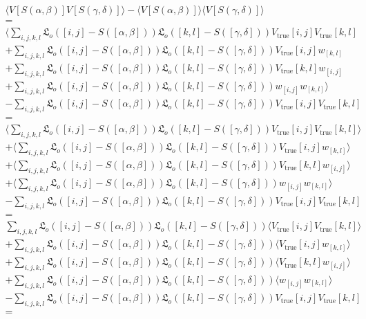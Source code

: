 \documentclass[times]{aastex6}
\begin{document}
\begin{multline*}
   \langle V[S(\alpha, \beta)]V[S(\gamma, \delta)] \rangle - \langle V[S(\alpha, \beta)] \rangle \langle V[S(\gamma, \delta)] \rangle \\ = \\ \langle \sum_{i,j,k,l}\mathfrak{L}_{o}([i,j] - S([\alpha, \beta]))\mathfrak{L}_{o}([k,l] - S([\gamma, \delta]))V_{\mathrm{true}}[i,j]V_{\mathrm{true}}[k,l] \\ + \sum_{i,j,k,l}\mathfrak{L}_{o}([i,j] - S([\alpha, \beta]))\mathfrak{L}_{o}([k,l] - S([\gamma, \delta]))V_{\mathrm{true}}[i,j]w_{[k,l]} \\ + \sum_{i,j,k,l}\mathfrak{L}_{o}([i,j] - S([\alpha, \beta]))\mathfrak{L}_{o}([k,l] - S([\gamma, \delta]))V_{\mathrm{true}}[k,l]w_{[i,j]} \\ + \sum_{i,j,k,l}\mathfrak{L}_{o}([i,j] - S([\alpha, \beta]))\mathfrak{L}_{o}([k,l] - S([\gamma, \delta]))w_{[i,j]}w_{[k,l]} \rangle \\ - \sum_{i,j,k,l}\mathfrak{L}_{o}([i,j] - S([\alpha, \beta])) \mathfrak{L}_{o}([k,l] - S([\gamma, \delta])) V_{\mathrm{true}}[i,j] V_{\mathrm{true}}[k,l] \\ = \\ \langle \sum_{i,j,k,l}\mathfrak{L}_{o}([i,j] - S([\alpha, \beta]))\mathfrak{L}_{o}([k,l] - S([\gamma, \delta]))V_{\mathrm{true}}[i,j]V_{\mathrm{true}}[k,l] \rangle \\ + \langle \sum_{i,j,k,l}\mathfrak{L}_{o}([i,j] - S([\alpha, \beta]))\mathfrak{L}_{o}([k,l] - S([\gamma, \delta]))V_{\mathrm{true}}[i,j]w_{[k,l]} \rangle \\ + \langle \sum_{i,j,k,l}\mathfrak{L}_{o}([i,j] - S([\alpha, \beta]))\mathfrak{L}_{o}([k,l] - S([\gamma, \delta]))V_{\mathrm{true}}[k,l]w_{[i,j]} \rangle \\ + \langle \sum_{i,j,k,l}\mathfrak{L}_{o}([i,j] - S([\alpha, \beta]))\mathfrak{L}_{o}([k,l] - S([\gamma, \delta]))w_{[i,j]}w_{[k,l]} \rangle \\ - \sum_{i,j,k,l}\mathfrak{L}_{o}([i,j] - S([\alpha, \beta])) \mathfrak{L}_{o}([k,l] - S([\gamma, \delta])) V_{\mathrm{true}}[i,j] V_{\mathrm{true}}[k,l] \\ = \\ \sum_{i,j,k,l}\mathfrak{L}_{o}([i,j] - S([\alpha, \beta]))\mathfrak{L}_{o}([k,l] - S([\gamma, \delta])) \langle V_{\mathrm{true}}[i,j]V_{\mathrm{true}}[k,l] \rangle \\ + \sum_{i,j,k,l}\mathfrak{L}_{o}([i,j] - S([\alpha, \beta]))\mathfrak{L}_{o}([k,l] - S([\gamma, \delta])) \langle V_{\mathrm{true}}[i,j]w_{[k,l]} \rangle \\ + \sum_{i,j,k,l}\mathfrak{L}_{o}([i,j] - S([\alpha, \beta]))\mathfrak{L}_{o}([k,l] - S([\gamma, \delta])) \langle V_{\mathrm{true}}[k,l]w_{[i,j]} \rangle \\ + \sum_{i,j,k,l}\mathfrak{L}_{o}([i,j] - S([\alpha, \beta]))\mathfrak{L}_{o}([k,l] - S([\gamma, \delta])) \langle w_{[i,j]}w_{[k,l]} \rangle \\ - \sum_{i,j,k,l}\mathfrak{L}_{o}([i,j] - S([\alpha, \beta])) \mathfrak{L}_{o}([k,l] - S([\gamma, \delta])) V_{\mathrm{true}}[i,j] V_{\mathrm{true}}[k,l] \\ = \\ 
\end{multline*}
\end{document}
